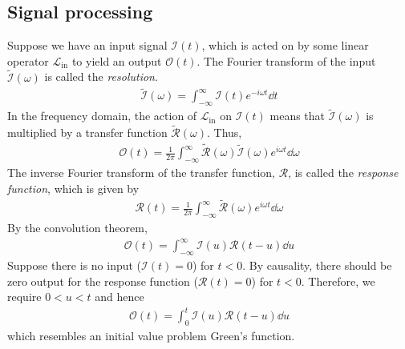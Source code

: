 \subsection{Signal processing}
Suppose we have an input signal $\mathcal I(t)$, which is acted on by some linear operator $\mathcal L_{\text{in}}$ to yield an output $\mathcal O(t)$.
The Fourier transform of the input $\widetilde{\mathcal I}(\omega)$ is called the \textit{resolution}.
\begin{align*}
	\widetilde{\mathcal I}(\omega) = \int_{-\infty}^\infty \mathcal I(t) e^{-i\omega t} \dd{t}
\end{align*}
In the frequency domain, the action of $\mathcal L_{\text{in}}$ on $\mathcal I(t)$ means that $\widetilde{\mathcal I}(\omega)$ is multiplied by a transfer function $\widetilde{\mathcal R}(\omega)$.
Thus,
\begin{align*}
	\mathcal O(t) = \frac{1}{2\pi} \int_{-\infty}^\infty \widetilde{\mathcal R}(\omega) \widetilde{\mathcal I}(\omega) e^{i\omega t} \dd{\omega}
\end{align*}
The inverse Fourier transform of the transfer function, $\mathcal R$, is called the \textit{response function}, which is given by
\begin{align*}
	\mathcal R(t) = \frac{1}{2\pi} \int_{-\infty}^\infty \widetilde{\mathcal R}(\omega) e^{i \omega t}\dd{\omega}
\end{align*}
By the convolution theorem,
\begin{align*}
	\mathcal O(t) = \int_{-\infty}^\infty \mathcal I(u) \mathcal R(t-u) \dd{u}
\end{align*}
Suppose there is no input ($\mathcal I(t) = 0$) for $t < 0$.
By causality, there should be zero output for the response function ($\mathcal R(t) = 0$) for $t < 0$.
Therefore, we require $0 < u < t$ and hence
\begin{align*}
	\mathcal O(t) = \int_0^t \mathcal I(u) \mathcal R(t-u) \dd{u}
\end{align*}
which resembles an initial value problem Green's function.

